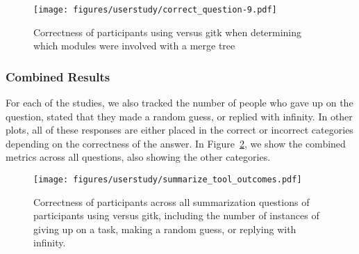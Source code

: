
\begin{figure}[htpb]
  \centering
  \texttt{[image: figures/userstudy/correct\_question-9.pdf]}
  \caption{Correctness of participants using \tool versus gitk when
    determining which modules were involved with a merge tree}
  \label{fig:figures/userstudy/correct_question-9}
\end{figure}

\subsubsection{Combined Results}
\label{ssub:combined_results}




%

For each of the studies, we also tracked the number of people who gave
up on the question, stated that they made a random guess, or replied
with infinity. In other plots, all of these responses are either placed
in the correct or incorrect categories depending on the correctness of
the answer. In Figure~\ref{fig:summarization_correctness}, we show the
combined metrics across all questions, also showing the other
categories.

\begin{figure}[htpb]
  \centering
  \texttt{[image: figures/userstudy/summarize\_tool\_outcomes.pdf]}
  \caption{Correctness of participants across all summarization
    questions of participants using \tool versus gitk, including the
    number of instances of giving up on a task, making a random guess,
    or replying with infinity.}
  \label{fig:summarization_correctness}
\end{figure}
